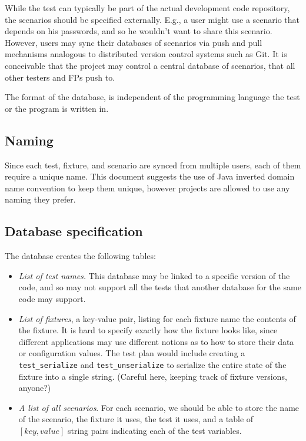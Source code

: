 \documentclass{article}
\begin{document}
While the test can typically be part of the actual development
code repository, the scenarios should be specified externally. E.g., a user
might use a scenario that depends on his passwords, and so he wouldn't
want to share this scenario. However, users may sync their databases
of scenarios via push and pull mechanisms analogous to distributed
version control systems such as Git. It is conceivable that the
project may control a central database of scenarios, that all other
testers and FPs push to. 

The format of the database, is independent of the programming language
the test or the program is written in.

\subsection{Naming}

Since each test, fixture, and scenario are synced from multiple users,
each of them require a unique name. This document suggests the use of
Java inverted domain name convention to keep them unique, however
projects are allowed to use any naming they prefer.

\subsection{Database specification}

The database creates the following tables:

\begin{itemize}
\item \emph{List of test names.} This database may be linked to a
specific version of the code, and so may not support all the tests
that another database for the same code may support.
\item \emph{List of fixtures}, a key-value pair, listing for each fixture name the
contents of the fixture. It is hard to specify exactly how
the fixture looks like, since different applications may use different
notions as to how to store their data or configuration values. The
test plan would include creating a \verb|test_serialize| and
\verb|test_unserialize| to serialize the entire state of the fixture into a
single string. (Careful here, keeping track of fixture versions,
anyone?)
\item \emph{A list of all scenarios}. For each scenario, we should be
  able to store the name of the scenario, the fixture it uses, the
  test it uses, and a table of $[key,value]$ string pairs indicating
  each of the test variables.
\end{itemize}
\end{document}
